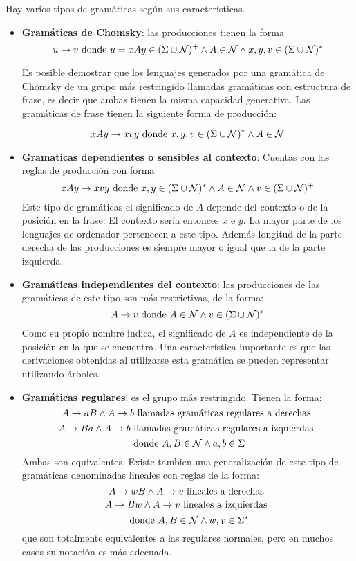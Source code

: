 Hay varios tipos de gramáticas según sus características.
\begin{itemize}
\item \textbf{Gramáticas de Chomsky}: las producciones tienen la forma \[u \rightarrow v \textup{ donde } u=xAy \in (\Sigma \cup \mathcal{N})^{+} \wedge A \in \mathcal{N} \wedge x, y, v \in (\Sigma \cup \mathcal{N})^{*}\]

Es posible demostrar que los lenguajes generados por una gramática de Chomsky de un grupo más restringido llamadas gramáticas con estructura de frase, es decir que ambas tienen la misma capacidad generativa. Las gramáticas de frase tienen la siguiente forma de producción:

\[xAy \rightarrow xvy \textup{ donde } x,y,v \in (\Sigma \cup \mathcal{N})^{*} \wedge A \in \mathcal{N}\]
\item \textbf{Gramaticas dependientes o sensibles al contexto}: Cuentas con las reglas de producción con forma  \[xAy \rightarrow xvy \textup{ donde } x, y \in (\Sigma \cup \mathcal{N})^{*} \wedge A \in \mathcal{N} \wedge v \in (\Sigma \cup \mathcal{N})^{+}\]
Este tipo de gramáticas el significado de $A$ depende del contexto o de la posición en la frase. El contexto sería entonces $x$ e $y$. La mayor parte de los lenguajes de ordenador pertenecen a este tipo. Además longitud de la parte derecha de las producciones es siempre mayor o igual que la de la parte izquierda.
\item \textbf{Gramáticas independientes del contexto}: las producciones de las gramáticas de este tipo son más restrictivas, de la forma: 
\[A \rightarrow v \textup{ donde } A \in \mathcal{N} \wedge v \in (\Sigma \cup \mathcal{N})^{*}\]
Como su propio nombre indica, el significado de $A$ es independiente de la posición en la que se encuentra. Una característica importante es que las derivaciones obtenidas al utilizarse esta gramática se pueden representar utilizando árboles.

\item \textbf{Gramáticas regulares}: es el grupo más restringido. Tienen la forma: \[A \rightarrow aB \wedge A \rightarrow b \textup{ llamadas gramáticas regulares a derechas } \]
\[A \rightarrow Ba \wedge A \rightarrow b \textup{ llamadas gramáticas regulares a izquierdas } \]
\[ \textup{ donde }A, B \in \mathcal{N} \wedge a,b \in \Sigma  \]
Ambas son equivalentes. Existe tambien una generalización de este tipo de gramáticas denominadas lineales con reglas de la forma: \[A \rightarrow wB \wedge A \rightarrow v \textup{ lineales a derechas } \]
\[A \rightarrow Bw \wedge A \rightarrow v \textup{ lineales a izquierdas } \]
\[ \textup{ donde }A, B \in \mathcal{N} \wedge w,v \in \Sigma^{*}  \]
que son totalmente equivalentes a las regulares normales, pero en muchos casos su notación es más adecuada.
\end{itemize}


